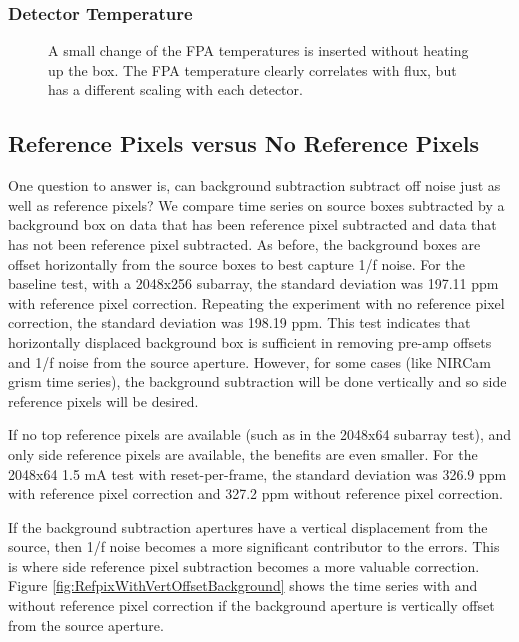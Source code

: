 \documentclass{aastex62}
\begin{document}
\subsubsection{Detector Temperature}



\begin{figure}
{}
\caption{A small change of the FPA temperatures is inserted without heating up the box.
The FPA temperature clearly correlates with flux, but has a different scaling with each detector.}\label{fig:fpaTChangeSmall}
\end{figure}


\clearpage
\subsection{Reference Pixels versus No Reference Pixels}
One question to answer is, can background subtraction subtract off noise just as well as reference pixels?
We compare time series on source boxes subtracted by a background box on data that has been reference pixel subtracted and data that has not been reference pixel subtracted.
As before, the background boxes are offset horizontally from the source boxes to best capture 1/f noise.
For the baseline test, with a 2048x256 subarray, the standard deviation was 197.11 ppm with reference pixel correction.
Repeating the experiment with no reference pixel correction, the standard deviation was 198.19 ppm.
This test indicates that horizontally displaced background box is sufficient in removing pre-amp offsets and 1/f noise from the source aperture.
However, for some cases (like NIRCam grism time series), the background subtraction will be done vertically and so side reference pixels will be desired.

If no top reference pixels are available (such as in the 2048x64 subarray test), and only side reference pixels are available, the benefits are even smaller.
For the 2048x64 1.5 mA test with reset-per-frame, the standard deviation was 326.9 ppm with reference pixel correction and 327.2 ppm without reference pixel correction.

If the background subtraction apertures have a vertical displacement from the source, then 1/f noise becomes a more significant contributor to the errors.
This is where side reference pixel subtraction becomes a more valuable correction.
Figure \ref{fig:RefpixWithVertOffsetBackground} shows the time series with and without reference pixel correction if the background aperture is vertically offset from the source aperture.
\end{document}
